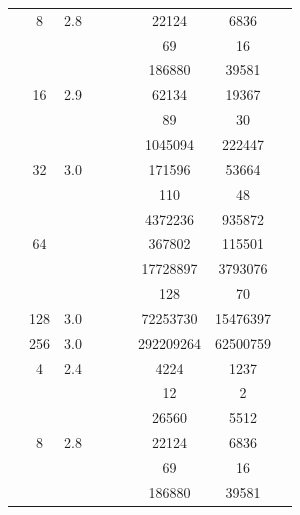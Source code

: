 \begin{table}[htbp]
\begin{tabular}{l S[table-format=3.0] S[table-format=4.1] l S[table-format=6.0] S[table-format=6.0] S[table-format=6.0] S[table-format=5.0] S[table-format=2.0]}
     & 8 & 2.8 &  & {\text{---}} & {\text{---}} & 22124 & 6836 & {\text{---}} \\
     &  &  &  & {\text{---}} & {\text{---}} & 69 & 16 & {\text{---}} \\
     &  &  &  & {\text{---}} & {\text{---}} & 186880 & 39581 & {\text{---}} \\
     & 16 & 2.9 &  & {\text{---}} & {\text{---}} & 62134 & 19367 & {\text{---}} \\
     &  &  &  & {\text{---}} & {\text{---}} & 89 & 30 & {\text{---}} \\
     &  &  &  & {\text{---}} & {\text{---}} & 1045094 & 222447 & {\text{---}} \\
     & 32 & 3.0 &  & {\text{---}} & {\text{---}} & 171596 & 53664 & {\text{---}} \\
     &  &  &  & {\text{---}} & {\text{---}} & 110 & 48 & {\text{---}} \\
     &  &  &  & {\text{---}} & {\text{---}} & 4372236 & 935872 & {\text{---}} \\
     & 64 & {\text{---}} &  & {\text{---}} & {\text{---}} & 367802 & 115501 & {\text{---}} \\
     &  &  &  & {\text{---}} & {\text{---}} & 17728897 & 3793076 & {\text{---}} \\
     &  &  &  & {\text{---}} & {\text{---}} & 128 & 70 & {\text{---}} \\
     & 128 & 3.0 &  & {\text{---}} & {\text{---}} & 72253730 & 15476397 & {\text{---}} \\
     & 256 & 3.0 &  & {\text{---}} & {\text{---}} & 292209264 & 62500759 & {\text{---}} \\
    \midrule
     & 4 & 2.4 &  & {\text{---}} & {\text{---}} & 4224 & 1237 & {\text{---}} \\
     &  &  &  & {\text{---}} & {\text{---}} & 12 & 2 & {\text{---}} \\
     &  &  &  & {\text{---}} & {\text{---}} & 26560 & 5512 & {\text{---}} \\
     & 8 & 2.8 &  & {\text{---}} & {\text{---}} & 22124 & 6836 & {\text{---}} \\
     &  &  &  & {\text{---}} & {\text{---}} & 69 & 16 & {\text{---}} \\
     &  &  &  & {\text{---}} & {\text{---}} & 186880 & 39581 & {\text{---}} \\

\end{tabular}
\end{table}
